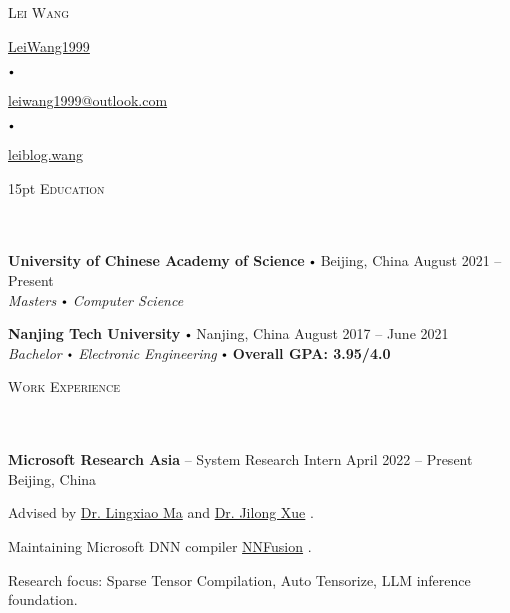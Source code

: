 \documentclass{article}
\newcommand{\contact}[3]{
\vspace*{5pt}
\begin{center}
{\LARGE \scshape {#1}}\\
\vspace{3pt}
#2 
\vspace{2pt}
#3
\end{center}
\vspace*{-8pt}
}
\newcommand{\header}[1]{{
\hspace*{-15pt}\vspace*{6pt} \textsc{#1}} \vspace*{-6pt} 
\lineunder
}
\newcommand{\lineunder}{
\vspace*{-8pt} \\ \hspace*{-18pt} 
\hrulefill \\
}
\newcommand{\school}[4]{
\textbf{#1} \labelitemi #2 \hfill #3 \\ #4 \vspace*{5pt}
}
\newcommand{\employer}[4]{{
\vspace*{2pt}%
\textbf{#1} #2 \hfill #3\\ #4 \vspace*{2pt}}
}
\renewcommand{\labelitemi}{
$\vcenter{\hbox{\tiny$\bullet$}}$\hspace*{3pt}
}
\renewcommand{\labelitemii}{
$\vcenter{\hbox{\tiny$\bullet$}}$\hspace*{-3pt}
}
\newcommand{\myhref}[2]{%
\href{#1}{\textcolor{ColorTwo}{#2}}
}
\newenvironment{bullet-list-minor}{
\begin{list}{\labelitemii}{\setlength\leftmargin{15pt} 
\topsep 0pt \itemsep -2pt}}{\vspace*{4pt}\end{list}
}
\begin{document}
\small
\smallskip
\vspace*{-44pt}

\contact{Lei Wang}
{
\textcolor{ColorTwo}{\faGithub} 
\myhref{https://github.com/LeiWang1999}{LeiWang1999} 
\labelitemi 
\textcolor{ColorTwo}{\faEnvelopeO} 
\myhref{mailto:leiwang1999@outlook.com}{leiwang1999@outlook.com}
\labelitemi
\textcolor{ColorTwo}{\faChain} 
\myhref{https://leiblog.wang}{leiblog.wang}
}

\vspace{15pt}
\header{Education}
    \school{University of Chinese Academy of Science}{Beijing, China}{August 2021 -- Present}
    {\textit{Masters \labelitemi Computer Science}}

    \school{Nanjing Tech University}{Nanjing, China}{August 2017 -- June 2021}
    {\textit{Bachelor \labelitemi Electronic Engineering} \labelitemi \textcolor{ColorOne}{\textbf{Overall GPA: 3.95/4.0}}}

\vspace*{4pt}%
\header{Work Experience}
    \employer{Microsoft Research Asia}{-- System Research Intern}{April 2022 -- Present}{Beijing, China}
	\begin{bullet-list-minor}
	\item Advised by \myhref{https://xysmlx.github.io/}{Dr. Lingxiao Ma} and \myhref{https://www.microsoft.com/en-us/research/people/jxue/}{Dr. Jilong Xue}.
	\item Maintaining Microsoft DNN compiler \myhref{https://github.com/microsoft/nnfusion}{NNFusion}.
	\item Research focus: Sparse Tensor Compilation, Auto Tensorize, LLM inference foundation.   
    \end{bullet-list-minor}
\end{document}
